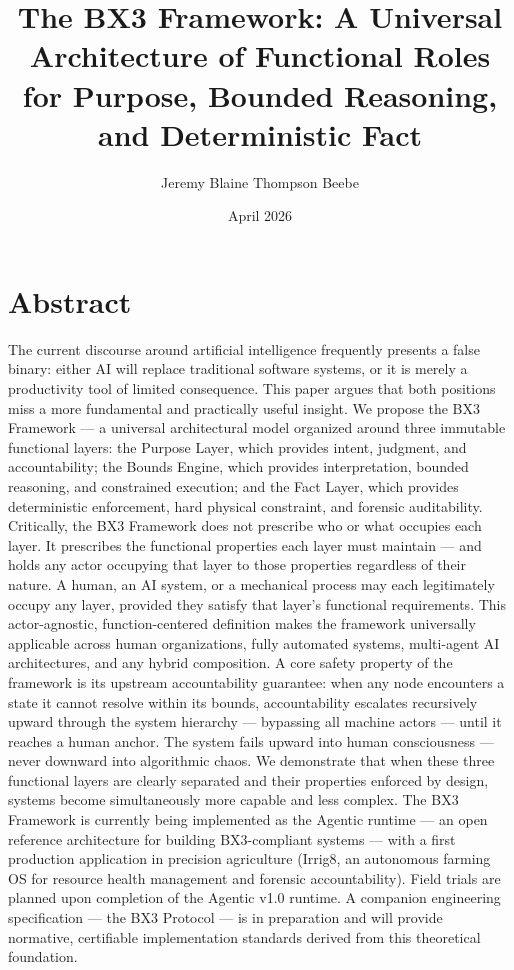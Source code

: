\documentclass[11pt, a4paper]{article}
\title{\textbf{The BX3 Framework: A Universal Architecture of Functional Roles for Purpose, Bounded Reasoning, and Deterministic Fact}}
\author{Jeremy Blaine Thompson Beebe}
\affil{Independent Researcher}
\date{April 2026}
\begin{document}
\maketitle
\section*{Abstract}
The current discourse around artificial intelligence frequently presents a false binary: either AI will replace traditional software systems, or it is merely a productivity tool of limited consequence. This paper argues that both positions miss a more fundamental and practically useful insight. We propose the BX3 Framework --- a universal architectural model organized around three immutable functional layers: the Purpose Layer, which provides intent, judgment, and accountability; the Bounds Engine, which provides interpretation, bounded reasoning, and constrained execution; and the Fact Layer, which provides deterministic enforcement, hard physical constraint, and forensic auditability. Critically, the BX3 Framework does not prescribe who or what occupies each layer. It prescribes the functional properties each layer must maintain --- and holds any actor occupying that layer to those properties regardless of their nature. A human, an AI system, or a mechanical process may each legitimately occupy any layer, provided they satisfy that layer's functional requirements. This actor-agnostic, function-centered definition makes the framework universally applicable across human organizations, fully automated systems, multi-agent AI architectures, and any hybrid composition. A core safety property of the framework is its upstream accountability guarantee: when any node encounters a state it cannot resolve within its bounds, accountability escalates recursively upward through the system hierarchy --- bypassing all machine actors --- until it reaches a human anchor. The system fails upward into human consciousness --- never downward into algorithmic chaos. We demonstrate that when these three functional layers are clearly separated and their properties enforced by design, systems become simultaneously more capable and less complex. The BX3 Framework is currently being implemented as the Agentic runtime --- an open reference architecture for building BX3-compliant systems --- with a first production application in precision agriculture (Irrig8, an autonomous farming OS for resource health management and forensic accountability). Field trials are planned upon completion of the Agentic v1.0 runtime. A companion engineering specification --- the BX3 Protocol --- is in preparation and will provide normative, certifiable implementation standards derived from this theoretical foundation.
\end{document}
